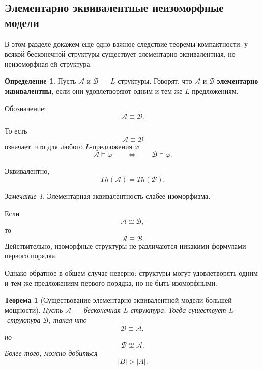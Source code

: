 \documentclass[12pt,a4paper,oneside,openany]{book}
\theoremstyle{definition}
\newtheorem{definition}{Определение}[chapter]
\theoremstyle{plain}
\newtheorem{theorem}{Теорема}[chapter]
\theoremstyle{remark}
\newtheorem{remark}{Замечание}[chapter]
\begin{document}
\subsection{Элементарно эквивалентные неизоморфные модели}

В этом разделе докажем ещё одно важное следствие теоремы компактности: у всякой бесконечной структуры существует элементарно эквивалентная, но неизоморфная ей структура.

\begin{definition}
Пусть $\mathcal A$ и $\mathcal B$ — $L$-структуры. Говорят, что $\mathcal A$ и $\mathcal B$ \textbf{элементарно эквивалентны}, если они удовлетворяют одним и тем же $L$-предложениям.

Обозначение:
\[
\mathcal A\equiv\mathcal B.
\]

То есть
\[
\mathcal A\equiv\mathcal B
\]
означает, что для любого $L$-предложения $\varphi$
\[
\mathcal A\models\varphi
\qquad
\Longleftrightarrow
\qquad
\mathcal B\models\varphi.
\]

Эквивалентно,
\[
Th(\mathcal A)=Th(\mathcal B).
\]
\end{definition}

\begin{remark}
Элементарная эквивалентность слабее изоморфизма.

Если
\[
\mathcal A\cong\mathcal B,
\]
то
\[
\mathcal A\equiv\mathcal B.
\]
Действительно, изоморфные структуры не различаются никакими формулами первого порядка.

Однако обратное в общем случае неверно: структуры могут удовлетворять одним и тем же предложениям первого порядка, но не быть изоморфными.
\end{remark}

\begin{theorem}[Существование элементарно эквивалентной модели большей мощности]
Пусть $\mathcal A$ — бесконечная $L$-структура. Тогда существует $L$-структура $\mathcal B$, такая что
\[
\mathcal B\equiv\mathcal A,
\]
но
\[
\mathcal B\not\cong\mathcal A.
\]
Более того, можно добиться
\[
|B|>|A|.
\]
\end{theorem}
\end{document}
